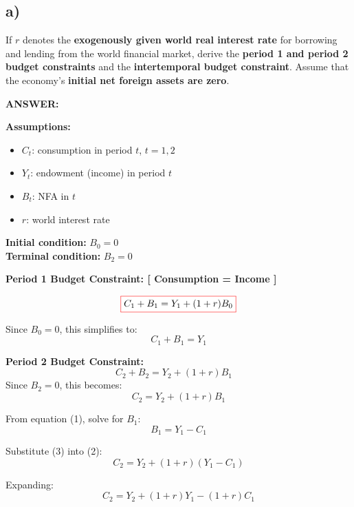 \documentclass[12pt]{article}
\begin{document}
\subsection*{\noindent\textbf{a)}}

If \( r \) denotes the \textbf{exogenously given world real interest rate} for borrowing and lending from the world financial market, derive the \textbf{period 1 and period 2 budget constraints} and the \textbf{intertemporal budget constraint}. Assume that the economy’s \textbf{initial net foreign assets are zero}.


\vspace{0.5em}
\noindent\textcolor{formalred}{\textbf{ANSWER:}}

\singlespacing


\textbf{Assumptions:}
\begin{itemize}
  \item \( C_t \): consumption in period \( t \), \( t = 1, 2 \)  
  \item \( Y_t \): endowment (income) in period \( t \)
  \item \( B_t \): NFA in \( t \) 
  \item \( r \): world interest rate
\end{itemize}

\textbf{Initial condition:} \( B_0 = 0 \) \\
\textbf{Terminal condition:} \( B_2 = 0 \)

\vspace{0.5em}
\textbf{Period 1 Budget Constraint: [ Consumption = Income ]}

\[
\fcolorbox{red}{white}{$
  C_1 + B_1 = Y_1 + (1 + r)B_0
$}
\]

Since \( B_0 = 0 \), this simplifies to:
\[
C_1 + B_1 = Y_1 \tag{1}
\]

\vspace{0.5em}
\textbf{Period 2 Budget Constraint:}
\[
C_2 + B_2 = Y_2 + (1 + r)B_1 \quad
\]
Since \( B_2 = 0 \), this becomes:
\[
C_2 = Y_2 + (1 + r)B_1 \tag{2}
\]

From equation (1), solve for \( B_1 \):
\[
B_1 = Y_1 - C_1 \tag{3}
\]

Substitute (3) into (2):
\[
C_2 = Y_2 + (1 + r)(Y_1 - C_1) \tag{4}
\]

Expanding:
\[
C_2 = Y_2 + (1 + r)Y_1 - (1 + r)C_1 \tag{5}
\]
\end{document}
